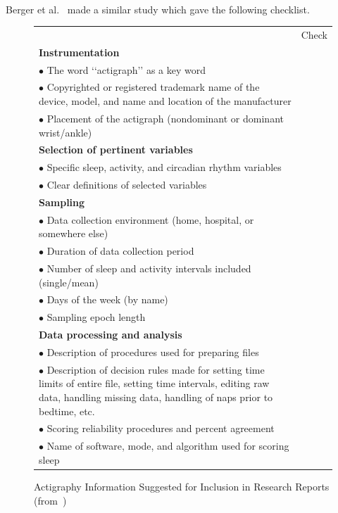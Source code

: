 \documentclass[a4paper,12pt]{article}
\newlength\savewidth
\newcommand\Ghline{%
	\noalign{\global\savewidth\arrayrulewidth\global\arrayrulewidth2pt}%
	\hline
	\noalign{\global\arrayrulewidth\savewidth}}
\begin{document}
\paragraph{}
Berger et al.~\cite{Berger2008} made a similar study which gave the following checklist.

\begin{figure}[H]
\centering
\begin{tabularx}{\textwidth}{|X|c|}
\hline
& Check \\
\Ghline
\textbf{Instrumentation} & \\
\hline
$\bullet$ The word ‘‘actigraph’’ as a key word & \\
\hline
$\bullet$ Copyrighted or registered trademark name of the device, model, and name and location of the manufacturer & \\
\hline
$\bullet$ Placement of the actigraph (nondominant or dominant wrist/ankle) & \\
\hline
\textbf{Selection of pertinent variables} & \\
\hline
$\bullet$ Specific sleep, activity, and circadian rhythm variables & \\
\hline
$\bullet$ Clear definitions of selected variables & \\
\hline
\textbf{Sampling} & \\
\hline
$\bullet$ Data collection environment (home, hospital, or somewhere else) & \\
\hline
$\bullet$ Duration of data collection period & \\
\hline
$\bullet$ Number of sleep and activity intervals included (single/mean) & \\
\hline
$\bullet$ Days of the week (by name) & \\
\hline
$\bullet$ Sampling epoch length & \\
\hline
\textbf{Data processing and analysis} & \\
\hline
$\bullet$ Description of procedures used for preparing files & \\
\hline
$\bullet$ Description of decision rules made for setting time limits of entire file, setting time intervals, editing raw data, handling missing data, handling of naps prior to bedtime, etc. & \\
\hline
$\bullet$ Scoring reliability procedures and percent agreement & \\
\hline
$\bullet$ Name of software, mode, and algorithm used for scoring sleep & \\
\hline
\end{tabularx}
\caption{Actigraphy Information Suggested for Inclusion in Research Reports (from~\cite{Berger2008})}
\label{checklistBerger}
\end{figure}
\end{document}
